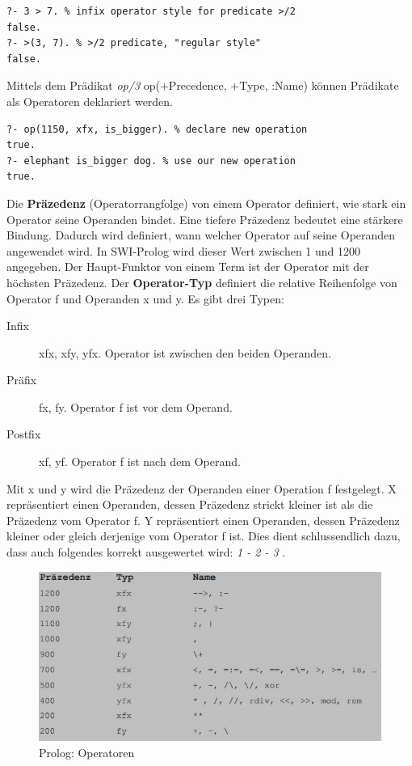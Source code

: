 \begin{lstlisting}[caption=Prädikat >/2]
?- 3 > 7. % infix operator style for predicate >/2
false.
?- >(3, 7). % >/2 predicate, "regular style"
false.
\end{lstlisting}

Mittels dem Prädikat \emph{op/3} op(+Precedence, +Type, :Name) können Prädikate als Operatoren deklariert werden.

\begin{lstlisting}[caption=is\_bigger/2 als Operator]
?- op(1150, xfx, is_bigger). % declare new operation
true.
?- elephant is_bigger dog. % use our new operation
true.
\end{lstlisting}

Die \textbf{Präzedenz} (Operatorrangfolge) von einem Operator definiert, wie stark ein Operator seine Operanden bindet. Eine tiefere Präzedenz bedeutet eine stärkere Bindung. Dadurch wird definiert, wann welcher Operator auf seine Operanden angewendet wird. In SWI-Prolog wird dieser Wert zwischen 1 und 1200 angegeben. Der Haupt-Funktor von einem Term ist der Operator mit der höchsten Präzedenz. Der \textbf{Operator-Typ} definiert die relative Reihenfolge von Operator f und Operanden x und y. Es gibt drei Typen:

\begin{description}
	\item[Infix] xfx, xfy, yfx. Operator ist zwischen den beiden Operanden.
	\item[Präfix] fx, fy. Operator f ist vor dem Operand.
	\item[Postfix] xf, yf. Operator f ist nach dem Operand.	
\end{description}

Mit x und y wird die Präzedenz der Operanden einer Operation f festgelegt. X repräsentiert einen Operanden, dessen Präzedenz strickt kleiner ist als die Präzedenz vom Operator f. Y repräsentiert einen Operanden, dessen Präzedenz kleiner oder gleich derjenige vom Operator f ist. Dies dient schlussendlich dazu, dass auch folgendes korrekt ausgewertet wird: \emph{1 - 2 - 3 }. 

\begin{figure}[h!]
\centering
\includegraphics[width=0.7\linewidth]{fig/prolog-operatoren}
\caption{Prolog: Operatoren}
\label{fig:prolog-operatoren}
\end{figure}

